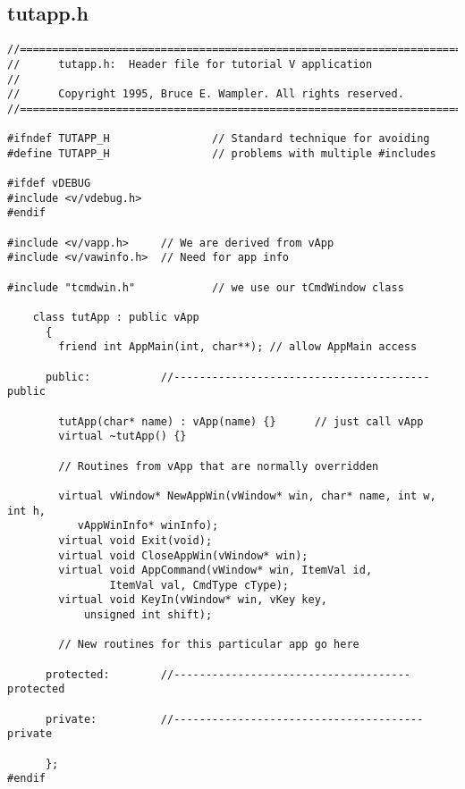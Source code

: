 \subsection*{tutapp.h}

%
\footnotesize
\begin{verbatim}
//========================================================================
//      tutapp.h:  Header file for tutorial V application
//
//      Copyright 1995, Bruce E. Wampler. All rights reserved.
//========================================================================

#ifndef TUTAPP_H                // Standard technique for avoiding
#define TUTAPP_H                // problems with multiple #includes

#ifdef vDEBUG
#include <v/vdebug.h>
#endif

#include <v/vapp.h>     // We are derived from vApp
#include <v/vawinfo.h>  // Need for app info

#include "tcmdwin.h"            // we use our tCmdWindow class

    class tutApp : public vApp
      {
        friend int AppMain(int, char**); // allow AppMain access

      public:           //---------------------------------------- public

        tutApp(char* name) : vApp(name) {}      // just call vApp
        virtual ~tutApp() {}

        // Routines from vApp that are normally overridden

        virtual vWindow* NewAppWin(vWindow* win, char* name, int w, int h,
           vAppWinInfo* winInfo);
        virtual void Exit(void);
        virtual void CloseAppWin(vWindow* win);
        virtual void AppCommand(vWindow* win, ItemVal id,
                ItemVal val, CmdType cType);
        virtual void KeyIn(vWindow* win, vKey key,
            unsigned int shift);

        // New routines for this particular app go here

      protected:        //------------------------------------- protected

      private:          //--------------------------------------- private

      };
#endif

\end{verbatim}
\normalfont\normalsize

